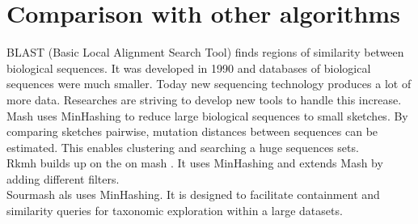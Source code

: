 \section{Comparison with other algorithms}


BLAST (Basic Local Alignment Search Tool) \cite{blast} finds regions of similarity between biological sequences. It was developed in 1990 and databases of biological sequences were much smaller. Today new sequencing technology produces a lot of more data. Researches are striving to develop new tools to handle this increase.\\

Mash \cite{mash} uses MinHashing to reduce large biological sequences to small sketches. By comparing sketches pairwise, mutation distances between sequences can be estimated. This enables clustering and searching a huge sequences sets.\\

Rkmh builds up on the on mash \cite{mash}. It uses MinHashing and extends Mash by adding different filters.\\

Sourmash \cite{sourmash} als uses MinHashing. It is designed to facilitate containment and similarity queries for taxonomic exploration within a large datasets.\\\
